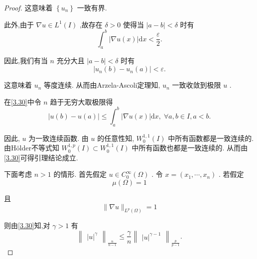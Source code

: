 \documentclass[lang=cn,newtx,10pt,scheme=chinese,thmcnt=chapter]{elegantbook}
\newcommand{\dif}{\mathrm{d}}
\begin{document}
\begin{proof}
这意味着 \(\left\{  {u}_{n}\right\}\) 一致有界.

此外,由于 \(\nabla u \in  {L}^{1}\left( I\right)\) ,故存在 \(\delta  > 0\) 使得当 \(\left| {a - b}\right|  < \delta\) 时有
\begin{equation*}
{\int }_{a}^{b}\left| {\nabla u\left( x\right) }\right| {\dif x} < \frac{\varepsilon }{2}.
\end{equation*}

因此,我们有当 \(n\) 充分大且 \(\left| {a - b}\right|  < \delta\) 时有
\begin{equation}
\left| {{u}_{n}\left( b\right)  - {u}_{n}\left( a\right) }\right|  < \varepsilon . \label{3.31}
\end{equation}

这意味着 \({u}_{n}\) 等度连续. 从而由Arzela-Ascoli定理知, \({u}_{n}\) 一致收敛到极限 \(u\) .

在\ref{3.30}中令 \(n\) 趋于无穷大取极限得
\begin{equation}
\left| {u\left( b\right)  - u\left( a\right) }\right|  \leqslant  {\int }_{a}^{b}\left| {\nabla u\left( x\right) }\right| {\dif x},\;\forall a,b \in  I,a < b. \label{3.32}
\end{equation}

因此, \(u\) 为一致连续函数. 由 \(u\) 的任意性知, \({W}_{0}^{1,1}\left( I\right)\) 中所有函数都是一致连续的. 由Hölder不等式知 \({W}_{0}^{1,p}\left( I\right)  \subset  {W}_{0}^{1,1}\left( I\right)\) 中所有函数也都是一致连续的. 从而由\ref{3.30}可得引理结论成立.

下面考虑 \(n > 1\) 的情形. 首先假定 \(u \in  {C}_{0}^{\infty }\left( \Omega \right)\) . 令 \(x = \left( {{x}_{1},\cdots ,{x}_{n}}\right)\) . 若假定
\begin{equation}
\mu \left( \Omega \right)  = 1 \label{3.33}
\end{equation}

且
\begin{equation}
\parallel \nabla u{\parallel }_{{L}^{p}\left( \Omega \right) } = 1 \label{3.34}
\end{equation}

则由\ref{3.30}知,对 \(\gamma  > 1\) 有
\begin{equation*}
{\begin{Vmatrix}{\left| u\right| }^{\gamma }\end{Vmatrix}}_{\frac{n}{n - 1}} \leqslant  \frac{\gamma }{n}{\begin{Vmatrix}{\left| u\right| }^{\gamma  - 1}\end{Vmatrix}}_{\frac{p}{p - 1}}.
\end{equation*}


\end{proof}
\end{document}
